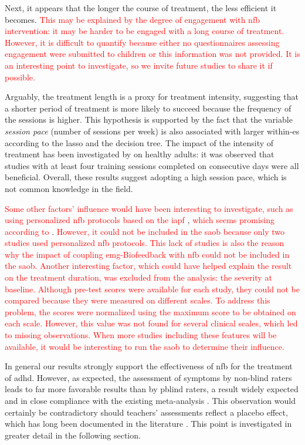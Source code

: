 Next, it appears that the longer the course of treatment, the less efficient it becomes. \textcolor{red}{This may be explained by the degree of 
engagement with \gls{nfb} intervention: it may be harder to be engaged with a long course of treatment. However, it is difficult to quantify because 
either no questionnaires assessing engagement  were submitted to children or this information was not provided. It is an interesting point to investigate,
so we invite future studies to share it if possible.}

Arguably, the treatment length is a proxy for treatment intensity, suggesting that a shorter period of treatment is more likely to succeed because the frequency of the sessions
is higher. This hypothesis is supported by the fact that the variable \emph{session pace} (number of
sessions per week) is also associated with larger within-\gls{es} according to the \gls{lasso} and the decision tree. The impact of the
intensity of treatment has been investigated by \citep{Rogala2016} on healthy adults: it was observed that studies with
at least four training sessions completed on consecutive days were all beneficial. Overall, these results suggest adopting a high session pace, 
which is not common knowledge in the field.

\textcolor{red}{Some other factors' influence would have been interesting to investigate, such as using personalized \gls{nfb} protocols based on the 
\gls{iapf}} \citep{Liu2016}, \textcolor{red}{which seems promising according to} \citet{Bazanova2018, Escolano2014}. \textcolor{red}{However, it could not be included in the 
\gls{saob} because only two studies used personalized \gls{nfb} protocols. This lack of studies is also the reason why the impact of coupling \gls{emg}-Biofeedback with \gls{nfb} could not be 
included in the \gls{saob}. Another interesting factor, which could have helped explain the result on the treatment duration, was excluded from the analysis: 
the severity at baseline. Although pre-test scores were available for each study, they could not be compared because they were measured on different scales. 
To address this problem, the scores were normalized using the maximum score to be obtained on each scale. However, this value was not found for several clinical scales, 
which led to missing observations. When more studies including these features will be available, it would be interesting to run the \gls{saob} to determine their influence.} 

In general our results strongly support the effectiveness of \gls{nfb} for the treatment of \gls{adhd}. However, as expected, 
the assessment of symptoms by non-blind raters leads to far more favorable results than by \gls{pblind} raters, a result 
widely expected and in close compliance with the existing meta-analysis \citep{Cortese2016, Micoulaud2014}. 
This observation would certainly be contradictory should teachers’ 
assessments reflect a placebo effect, which has long been documented in the literature \citep{Sollie2013, Narad2015, Minder2018}. 
This point is investigated in greater detail in the following section.

